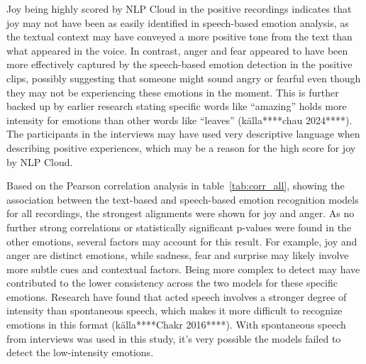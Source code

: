 Joy being highly scored by NLP Cloud in the positive recordings indicates that joy may not have been as easily identified in speech-based emotion analysis, as the textual context may have conveyed a more positive tone from the text than what appeared in the voice. In contrast, anger and fear appeared to have been more effectively captured by the speech-based emotion detection in the positive clips, possibly suggesting that someone might sound angry or fearful even though they may not be experiencing these emotions in the moment. This is further backed up by earlier research stating specific words like “amazing” holds more intensity for emotions than other words like “leaves” (källa****chau 2024****). The participants in the interviews may have used very descriptive language when describing positive experiences, which may be a reason for the high score for joy by NLP Cloud.

Based on the Pearson correlation analysis in table~\ref{tab:corr_all}, showing the association between the text-based and speech-based emotion recognition models for all recordings, the strongest alignments were shown for joy and anger. As no further strong correlations or statistically significant p-values were found in the other emotions, several factors may account for this result. For example, joy and anger are distinct emotions, while sadness, fear and surprise may likely involve more subtle cues and contextual factors. Being more complex to detect may have contributed to the lower consistency across the two models for these specific emotions. Research have found that acted speech involves a stronger degree of intensity than spontaneous speech, which makes it more difficult to recognize emotions in this format (källa****Chakr 2016****). With spontaneous speech from interviews was used in this study, it’s very possible the models failed to detect the low-intensity emotions.

